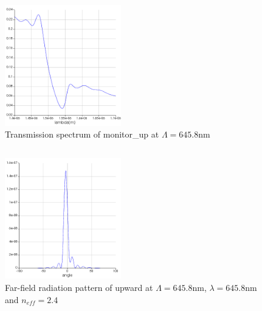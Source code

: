 \documentclass[fontsize=11pt]{scrartcl}
\begin{document}
\subsection{}
\begin{figure}[H]
    \centering
     \includegraphics[width=0.45\textwidth]{img/fig3.2.png}
     \caption{Transmission spectrum of monitor\_up at $\Lambda=645.8\mathrm{nm}$}
     \label{fig3.2}
\end{figure}
\subsection{}
\begin{figure}[H]
    \centering
     \includegraphics[width=0.45\textwidth]{img/fig3.3.png}
     \caption{Far-field radiation pattern of upward at $\Lambda=645.8\mathrm{nm}$,
     $\lambda=645.8\mathrm{nm}$ and $n_{eff}=2.4$}
     \label{fig3.3}
\end{figure}
\pagebreak
\end{document}
